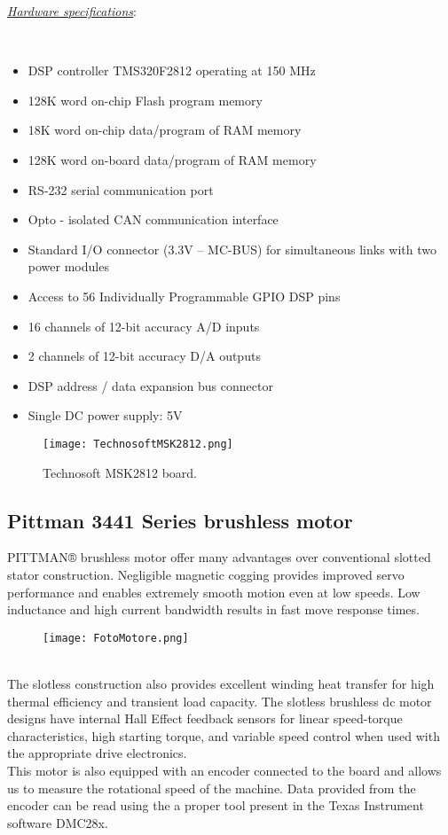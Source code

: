\documentclass[12pt]{article}
\begin{document}
\begin{Large}\textit{\underline{Hardware specifications}}:\end{Large}\\
\begin{itemize}
\item DSP controller TMS320F2812 operating at 150 MHz
\item 128K word on-chip Flash program memory
\item 18K word on-chip data/program of RAM memory
\item 128K word on-board data/program of RAM memory
\item RS-232 serial communication port
\item Opto - isolated CAN communication interface
\item Standard I/O connector (3.3V – MC-BUS) for simultaneous links with two power modules
\item Access to 56 Individually Programmable GPIO DSP pins
\item 16 channels of 12-bit accuracy A/D inputs
\item 2 channels of 12-bit accuracy D/A outputs
\item DSP address / data expansion bus connector
\item Single DC power supply: 5V
\end{itemize}

\begin{figure}[h]
\centering
\texttt{[image: TechnosoftMSK2812.png]}
\caption{\label{fig:setup}Technosoft MSK2812 board.}
\end{figure}

\newpage\subsection{Pittman 3441 Series brushless motor}

PITTMAN® brushless motor offer many advantages over conventional slotted stator construction. Negligible magnetic cogging provides improved servo performance and enables extremely smooth motion even at low speeds. Low inductance and high current bandwidth results in fast move response times. \\
\begin{figure}[h]
\centering
\texttt{[image: FotoMotore.png]}
\end{figure}\\[0.4cm]
The slotless construction also provides excellent winding heat transfer for high thermal efficiency and transient load capacity. The slotless brushless dc motor designs have internal Hall Effect feedback sensors for linear speed-torque characteristics, high starting torque, and variable speed control when used with the appropriate drive electronics.\\
This motor is also equipped with an encoder connected to the board and allows us to measure the rotational speed of the machine.
Data provided from the encoder can be read using the a proper tool present in the Texas Instrument software DMC28x.\\
\end{document}
